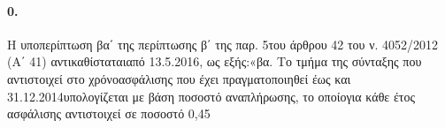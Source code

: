 \documentclass[a4paper,oneside, 10pt]{book}
\begin{document}
\paragraph { 0. } Η υποπερίπτωση βα΄ της περίπτωσης β΄ της παρ. 5του άρθρου 42 του ν. 4052/2012 (Α΄ 41) αντικαθίσταταιαπό 13.5.2016, ως εξής:«βα. Το τμήμα της σύνταξης που αντιστοιχεί στο χρόνοασφάλισης που έχει πραγματοποιηθεί έως και 31.12.2014υπολογίζεται με βάση ποσοστό αναπλήρωσης, το οποίογια κάθε έτος ασφάλισης αντιστοιχεί σε ποσοστό 0,45%
\end{document}
